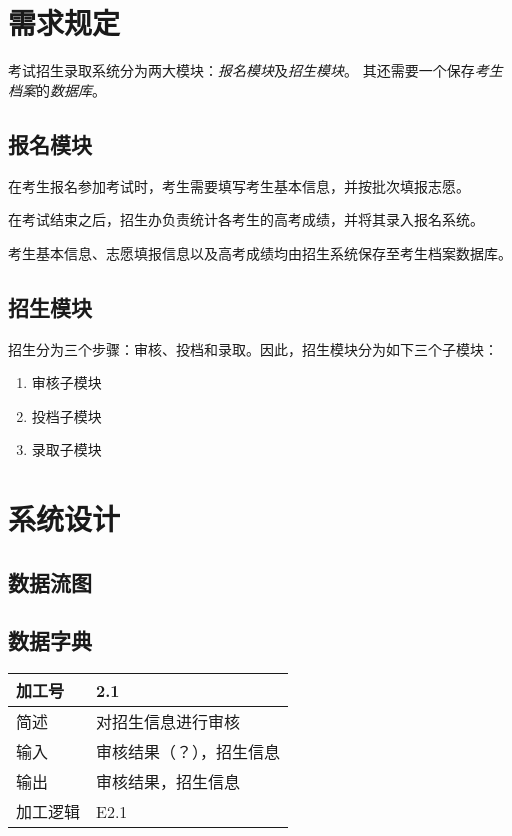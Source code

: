 \documentclass[CJK,utf8]{ctexrep}
\begin{document}
\section*{需求规定}

考试招生录取系统分为两大模块：\emph{报名模块}及\emph{招生模块}。
其还需要一个保存\emph{考生档案}的\emph{数据库}。

\subsection*{报名模块}

在考生报名参加考试时，考生需要填写考生基本信息，并按批次填报志愿。

在考试结束之后，招生办负责统计各考生的高考成绩，并将其录入报名系统。

考生基本信息、志愿填报信息以及高考成绩均由招生系统保存至考生档案数据库。

\subsection*{招生模块}

招生分为三个步骤：审核、投档和录取。因此，招生模块分为如下三个子模块：

\begin{enumerate}
	\item 审核子模块
	\item 投档子模块
	\item 录取子模块
\end{enumerate}

\section*{系统设计}

\subsection*{数据流图}

\subsection*{数据字典}

%
%
\begin{tabularx}{0.85\textwidth}{|l|X|}
	\hline
	加工号 & 2.1 \\
	\hline
	简述 & 对招生信息进行审核 \\
	\hline
	输入 & 审核结果（？），招生信息 \\
	\hline
	输出 & 审核结果，招生信息 \\
	\hline
	加工逻辑 & E2.1 \\
	\hline
\end{tabularx}
\end{document}
